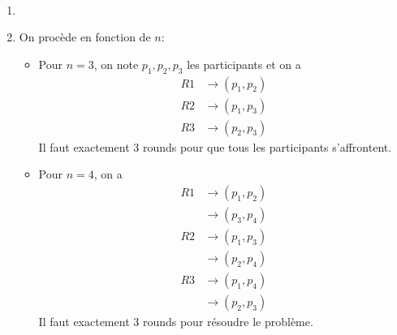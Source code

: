 \begin{td-sol}[]\, %
    \begin{enumerate}
        \item \,%
        \item On procède en fonction de \(n\):
        \begin{itemize}
            \item Pour \(n=3\), on note \(p_1,p_2,p_3\) les participants et on a
            \begin{equation*}
                \begin{aligned}
                    R1
                    &\rightarrow (p_1,p_2)\\
                    R2
                    &\rightarrow (p_1,p_3)\\
                    R3
                    &\rightarrow (p_2,p_3)
                \end{aligned}
            \end{equation*}
            Il faut exactement 3 rounds pour que tous les participants s'affrontent.
        
            \item Pour \(n=4\), on a
            \begin{equation*}
                \begin{aligned}
                    R1
                    &\rightarrow (p_1,p_2)\\
                    &\rightarrow (p_3,p_4)\\
                    R2
                    &\rightarrow (p_1,p_3)\\
                    &\rightarrow (p_2,p_4)\\
                    R3
                    &\rightarrow (p_1,p_4)\\
                    &\rightarrow (p_2,p_3)
                \end{aligned}
            \end{equation*}
            Il faut exactement 3 rounds pour résoudre le problème.
        

\end{itemize}
\end{enumerate}
\end{td-sol}
